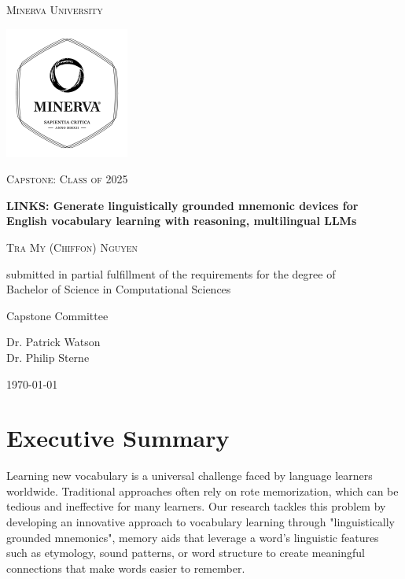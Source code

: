 \begin{titlepage}
\centering
{\scshape\LARGE Minerva University \par}
\vspace{1cm}
\begin{center}
  \includegraphics[width=0.4\linewidth]{minerva/minerva_logo.pdf}
\end{center}
{\scshape\Large Capstone: Class of 2025 \par}
\vspace{1.5cm}
{\huge\bfseries LINKS: Generate linguistically grounded mnemonic devices for English vocabulary learning with reasoning, multilingual LLMs \par}
\vspace{2cm}
{\scshape\large Tra My (Chiffon) Nguyen \par}

\vfill
submitted in partial fulfillment of the requirements for the degree of \\ Bachelor of Science in Computational Sciences \par
\vspace{2cm}
{\large Capstone Committee \par}
Dr. Patrick Watson \\
Dr. Philip Sterne \\
\vspace{2cm}
{\large \today\par}
\end{titlepage}

\onecolumn
\section*{Executive Summary} \label{sec:exec-summary}

Learning new vocabulary is a universal challenge faced by language learners worldwide. Traditional approaches often rely on rote memorization, which can be tedious and ineffective for many learners. Our research tackles this problem by developing an innovative approach to vocabulary learning through "linguistically grounded mnemonics", memory aids that leverage a word's linguistic features such as etymology, sound patterns, or word structure to create meaningful connections that make words easier to remember.

